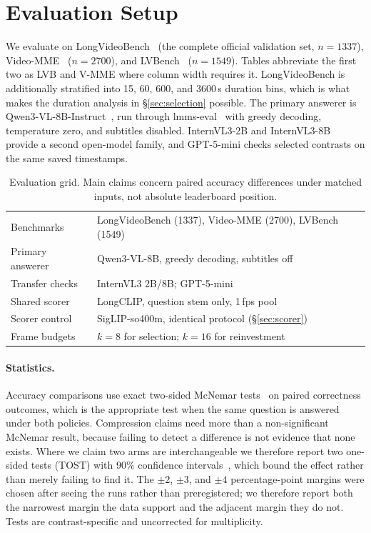 \documentclass[11pt]{article}
\begin{document}
\section{Evaluation Setup}
\label{sec:setup}

We evaluate on LongVideoBench~\citep{wu2024longvideobench} (the complete official validation set, $n{=}1337$), Video-MME~\citep{fu2025videomme} ($n{=}2700$), and LVBench~\citep{lvbench2025} ($n{=}1549$).
Tables abbreviate the first two as LVB and V-MME where column width requires it.
LongVideoBench is additionally stratified into 15, 60, 600, and 3600\,s duration bins, which is what makes the duration analysis in \S\ref{sec:selection} possible.
The primary answerer is Qwen3-VL-8B-Instruct~\citep{qwen3vl2025}, run through lmms-eval~\citep{zhang2024lmmseval} with greedy decoding, temperature zero, and subtitles disabled.
InternVL3-2B and InternVL3-8B~\citep{zhu2025internvl3} provide a second open-model family, and GPT-5-mini checks selected contrasts on the same saved timestamps.

\begin{table}[t]
\centering
\small
\begin{tabular}{@{}lp{}@{}}
\toprule
Benchmarks & LongVideoBench (1337), Video-MME (2700), LVBench (1549) \\
Primary answerer & Qwen3-VL-8B, greedy decoding, subtitles off \\
Transfer checks & InternVL3 2B/8B; GPT-5-mini \\
Shared scorer & LongCLIP, question stem only, 1\,fps pool \\
Scorer control & SigLIP-so400m, identical protocol (\S\ref{sec:scorer}) \\
Frame budgets & $k{=}8$ for selection; $k{=}16$ for reinvestment \\
\bottomrule
\end{tabular}
\caption{Evaluation grid. Main claims concern paired accuracy differences under matched inputs, not absolute leaderboard position.}
\label{tab:setup}
\end{table}

\paragraph{Statistics.}
Accuracy comparisons use exact two-sided McNemar tests~\citep{mcnemar1947} on paired correctness outcomes, which is the appropriate test when the same question is answered under both policies.
Compression claims need more than a non-significant McNemar result, because failing to detect a difference is not evidence that none exists.
Where we claim two arms are interchangeable we therefore report two one-sided tests (TOST) with 90\% confidence intervals~\citep{schuirmann1987}, which bound the effect rather than merely failing to find it.
The $\pm2$, $\pm3$, and $\pm4$ percentage-point margins were chosen after seeing the runs rather than preregistered; we therefore report both the narrowest margin the data support and the adjacent margin they do not.
Tests are contrast-specific and uncorrected for multiplicity.
\end{document}
